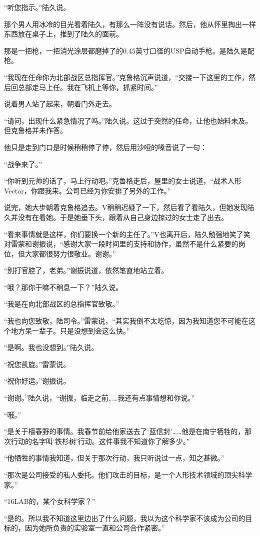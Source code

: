 “听您指示。”陆久说。

那个男人用冰冷的目光看着陆久，有那么一阵没有说话。然后，他从怀里掏出一样东西放在桌子上，推到了陆久的面前。

那是一把枪，一把消光涂层都磨掉了的0.45英寸口径的USP自动手枪。是陆久是配枪。

“我现在任命你为北部战区总指挥官。”克鲁格沉声说道，“交接一下这里的工作，然后回总部走马上任。我在飞机上等你，抓紧时间。”

说着男人站了起来，朝着门外走去。

“请问，出现什么紧急情况了吗。”陆久说。这过于突然的任命，让他也始料未及。但克鲁格并未作答。

他只是走到门口是时候稍稍停了停，然后用沙哑的嗓音说了一句：

“战争来了。”

“你听到元帅的话了，马上行动吧。”克鲁格走后，屋里的女士说道，“战术人形Vector，你跟我来。公司已经为你安排了另外的工作。”

说完，她大步朝着克鲁格追去。V稍稍迟疑了一下，然后看了看陆久，但她发现陆久并没有在看她。于是她垂下头，跟着从自己身边掠过的女士走了出去。

“看来事情就是这样，你们要换一个新的主任了。”V也离开后，陆久勉强地笑了笑对雷蒙和谢振说，“感谢大家一段时间里的支持和协作，虽然不是什么紧要的岗位，但大家都很努力很敬业。谢谢。”

“别打官腔了，老弟。”谢振说道，依然笔直地站立着。

“哦？那你干嘛不稍息一下？”陆久说。

“我是在向北部战区的总指挥官致敬。”

“我也向您致敬，陆司令。”雷蒙说，“其实我倒不太吃惊，因为我知道您不可能在这个地方呆一辈子。只是没想到会这么快。”

“是啊。我也没想到。”陆久说。

“祝您凯旋。”雷蒙说。

“祝你好运。”谢振说。

“谢谢。”陆久说，“谢振，临走之前……我还有点事情想和你说。” 

“哦。”

“是关于檀春野的事情。我春节前给他家送去了‘蓝信封’……他是在南宁牺牲的，那次行动的名字叫‘铁杉树’行动。这件事我不知道你了解多少。”

“他牺牲的事情我知道，但关于那次行动，我只听说过一点，知之甚微。”

“那次是公司接受的私人委托。他们攻击的目标，是一个人形技术领域的顶尖科学家。”

“16LAB的，某个女科学家？”

“是的。所以我不知道这里边出了什么问题，我以为这个科学家不该成为公司的目标的，因为她所负责的实验室一直和公司合作紧密。”

